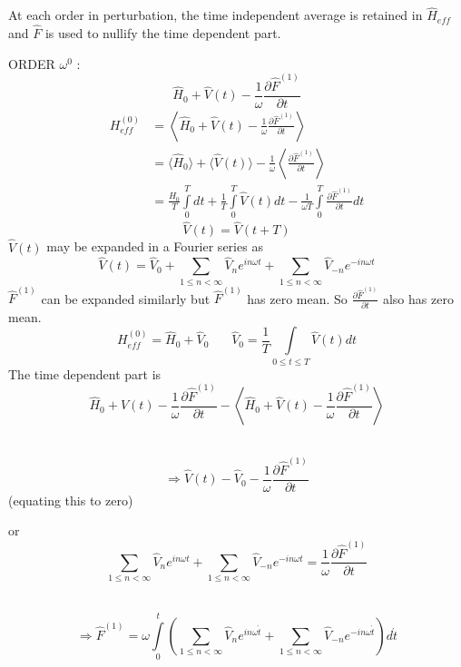 At each order in perturbation, the time independent average is retained in $\hat{H}_{eff}$ and
$\hat{F}$ is used to nullify the time dependent part.

ORDER $\omega^0$ :
\begin{equation*}
 \hat{H}_{0}+\hat{V}(t)-\frac{1}{\omega}\frac{\partial\hat{F}^{(1)}}{\partial t}
\end{equation*}
\begin{align*}
 H^{(0)}_{eff} &= \left\langle \hat{H}_0+ \hat{V}(t)-\frac{1}{\omega}\frac{\partial\hat{F}^{(1)}}{\partial t}\right\rangle \\
 &= \langle\hat{H}_0\rangle+ \langle\hat{V}(t)\rangle -\frac{1}{\omega}\left\langle\frac{\partial\hat{F}^{(1)}}{\partial t}\right\rangle \\
 &= \frac{\hat{H}_{0}}{T}\int\limits_{0}^{T}dt + \frac{1}{T}\int\limits_{0}^{T}\hat{V}(t)dt -\frac{1}{\omega T}\int\limits_{0}^{T}\frac{\partial\hat{F}^{(1)}}{\partial t}dt 
\end{align*}
\begin{equation*}
  \hat{V}(t)= \hat{V}(t+T)
\end{equation*}
$ \hat{V}(t)$ may be expanded in a Fourier series as 
\begin{equation*}
 \hat{V}(t)= \hat{V}_0 + \displaystyle\sum_{1\leq n<\infty}\hat{V}_{n}e^{in\omega t} + \displaystyle\sum_{1\leq n<\infty}\hat{V}_{-n}e^{-in\omega t}
\end{equation*}
$\hat{F}^{(1)}$ can be expanded similarly but $\hat{F}^{(1)}$ has zero mean. So $\frac{\partial\hat{F}^{(1)}}{\partial t}$ also has zero mean.
\begin{equation*}
 H_{eff}^{(0)} = \hat{H}_0 + \hat{V}_0 ~~~~~~~~ \hat{V}_0 = \frac{1}{T}\int\limits_{0\leq t\leq T}\hat{V}(t)dt
\end{equation*}
The time dependent part is 
~~~~~~~~~$$ \hat{H}_{0}+\hat{V}(t)-\frac{1}{\omega}\frac{\partial\hat{F}^{(1)}}{\partial t} -\left\langle \hat{H}_0+ \hat{V}(t)-\frac{1}{\omega}\frac{\partial\hat{F}^{(1)}}{\partial t}\right\rangle$$

~~~~~~~$$\Rightarrow \hat{V}(t) -\hat{V}_0 -\frac{1}{\omega}\frac{\partial\hat{F}^{(1)}}{\partial t}$$(equating this to zero)

or ~~~~~~~$$\displaystyle\sum_{1\leq n<\infty}\hat{V}_{n}e^{in\omega t} + \displaystyle\sum_{1\leq n<\infty}\hat{V}_{-n}e^{-in\omega t} = \frac{1}{\omega}\frac{\partial\hat{F}^{(1)}}{\partial t}$$

~~~~~~~$$\Rightarrow \hat{F}^{(1)} = \omega\int\limits_{0}^{t}\left(\displaystyle\sum_{1\leq n<\infty}\hat{V}_{n}e^{in\omega \acute{t}} + \displaystyle\sum_{1\leq n<\infty}\hat{V}_{-n}e^{-in\omega \acute{t}}\right)d\acute{t}$$

